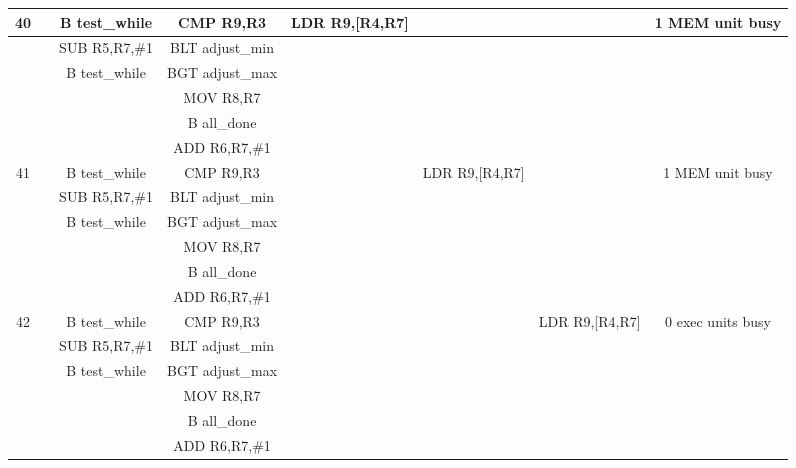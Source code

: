 \documentclass{article}
\begin{document}
{\begin{landscape}
\begin{longtable}{|c|c|c|c|c:c|c|c|}
    40 & & B test\_while & CMP R9,R3 & LDR R9,[R4,R7] & & & 1 MEM unit busy \\ \hline
     & & SUB R5,R7,\#1 & BLT adjust\_min & & & & \\ \hline
     & & B test\_while & BGT adjust\_max & &  & & \\ \hline
     &  &  & MOV R8,R7 & &  & & \\ \hline
     &  &  & B all\_done &  &  &  & \\ \hline
     &  &  & ADD R6,R7,\#1 &  &  &  & \\ \hline \hline
     
    41 & & B test\_while & CMP R9,R3 & & LDR R9,[R4,R7] & & 1 MEM unit busy \\ \hline
     & & SUB R5,R7,\#1 & BLT adjust\_min & & & & \\ \hline
     & & B test\_while & BGT adjust\_max & &  & & \\ \hline
     &  &  & MOV R8,R7 & &  & & \\ \hline
     &  &  & B all\_done &  &  &  & \\ \hline
     &  &  & ADD R6,R7,\#1 &  &  &  & \\ \hline \hline
     
    42 & & B test\_while & CMP R9,R3 & & & LDR R9,[R4,R7] & 0 exec units busy \\ \hline
     & & SUB R5,R7,\#1 & BLT adjust\_min & & & & \\ \hline
     & & B test\_while & BGT adjust\_max & &  & & \\ \hline
     &  &  & MOV R8,R7 & &  & & \\ \hline
     &  &  & B all\_done &  &  &  & \\ \hline
     &  &  & ADD R6,R7,\#1 &  &  &  & \\ \hline \hline
    

\end{longtable}
\end{landscape}}
\end{document}
